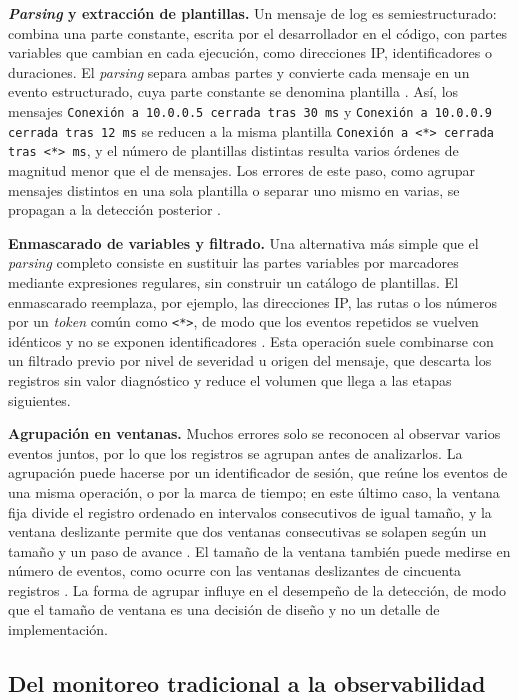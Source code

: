 \textbf{\textit{Parsing} y extracción de plantillas.} Un mensaje de log es semiestructurado: combina una parte constante, escrita por el desarrollador en el código, con partes variables que cambian en cada ejecución, como direcciones IP, identificadores o duraciones. El \textit{parsing} separa ambas partes y convierte cada mensaje en un evento estructurado, cuya parte constante se denomina plantilla \cite{he2021_survey}. Así, los mensajes \texttt{Conexión a 10.0.0.5 cerrada tras 30 ms} y \texttt{Conexión a 10.0.0.9 cerrada tras 12 ms} se reducen a la misma plantilla \texttt{Conexión a <*> cerrada tras <*> ms}, y el número de plantillas distintas resulta varios órdenes de magnitud menor que el de mensajes. Los errores de este paso, como agrupar mensajes distintos en una sola plantilla o separar uno mismo en varias, se propagan a la detección posterior \cite{sun2026_parsing}.

\textbf{Enmascarado de variables y filtrado.} Una alternativa más simple que el \textit{parsing} completo consiste en sustituir las partes variables por marcadores mediante expresiones regulares, sin construir un catálogo de plantillas. El enmascarado reemplaza, por ejemplo, las direcciones IP, las rutas o los números por un \textit{token} común como \texttt{<*>}, de modo que los eventos repetidos se vuelven idénticos y no se exponen identificadores \cite{guan2024_logllm}. Esta operación suele combinarse con un filtrado previo por nivel de severidad u origen del mensaje, que descarta los registros sin valor diagnóstico y reduce el volumen que llega a las etapas siguientes.

\textbf{Agrupación en ventanas.} Muchos errores solo se reconocen al observar varios eventos juntos, por lo que los registros se agrupan antes de analizarlos. La agrupación puede hacerse por un identificador de sesión, que reúne los eventos de una misma operación, o por la marca de tiempo; en este último caso, la ventana fija divide el registro ordenado en intervalos consecutivos de igual tamaño, y la ventana deslizante permite que dos ventanas consecutivas se solapen según un tamaño y un paso de avance \cite{he2021_survey}. El tamaño de la ventana también puede medirse en número de eventos, como ocurre con las ventanas deslizantes de cincuenta registros \cite{lim2025_logadreft}. La forma de agrupar influye en el desempeño de la detección, de modo que el tamaño de ventana es una decisión de diseño y no un detalle de implementación.

\subsection{Del monitoreo tradicional a la observabilidad}\label{sec:ant_observabilidad}

